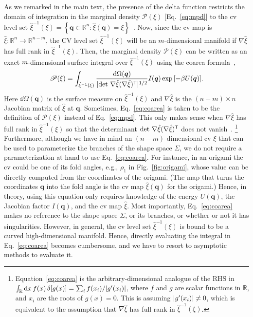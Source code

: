 As we remarked in the main text, the presence of the delta function restricts the domain of integration in the marginal density $\mathscr{P}(\xi)$ [Eq.~\eqref{eq:mpd}] to the \ac{cv} level set $\hat{\xi}^{-1}(\xi) = \left\{\bm{q} \in \mathbb{R}^{n}: \hat{\xi}(\bm{q}) = \xi\right\}$~\cite{hartmann2011}.
Now, since the \ac{cv} map is $\hat{\xi}: \mathbb{R}^{n} \to \mathbb{R}^{n-m}$, the CV level set $\hat{\xi}^{-1}(\xi)$ will be an $m$-dimensional manifold if $\nabla\hat{\xi}$ has full rank in $\hat{\xi}^{-1}(\xi)$.
Then, the marginal density $\mathscr{P}(\xi)$ can be written as an exact $m$-dimensional surface integral over $\hat{\xi}^{-1}(\xi)$ using the coarea formula~\cite{hartmann2007,lelievre2010,hartmann2011,diaconis2013},
%
\begin{equation}
  \mathscr{P}(\xi) = \int_{\hat{\xi}^{-1}(\xi)} \frac{\mathrm{d}\Omega(\bm{q})}{\lvert\det\,\nabla\hat{\xi}(\nabla\hat{\xi})^\mathsf{T}\rvert^{1/2}} I(\bm{q}) \exp{\left[-\beta U(\bm{q})\right]}.
  \label{eq:coarea}
\end{equation}
%
Here $\dd\Omega(\bm{q})$ is the surface measure on $\hat{\xi}^{-1}(\xi)$ and $\nabla\hat{\xi}$ is the $(n-m)\times n$ Jacobian matrix of $\hat{\xi}$ at $\bm{q}$.
Sometimes, Eq.~\eqref{eq:coarea} is taken to be the definition of $\mathscr{P}(\xi)$ instead of Eq.~\eqref{eq:mpd}.
This only makes sense when $\nabla\hat{\xi}$ has full rank in $\hat{\xi}^{-1}(\xi)$ so that the determinant $\det\,\nabla\hat{\xi}(\nabla\hat{\xi})^\mathsf{T}$ does not vanish~\cite{lelievre2010}.%
\footnote{Equation~\eqref{eq:coarea} is the arbitrary-dimensional analogue of the RHS in $\int_{\mathbb{R}} \mathrm{d}{x}\, f(x)\, \delta[g(x)] = \sum_{i} f(x_{i})/\lvert g'(x_{i})\rvert$, where $f$ and $g$ are scalar functions in $\mathbb{R}$, and $x_{i}$ are the roots of $g(x) = 0$. This is assuming $\lvert g'(x_{i})\rvert \neq 0$, which is equivalent to the assumption that $\nabla\hat{\xi}$ has full rank in $\hat{\xi}^{-1}(\xi)$.}
Furthermore, although we have in mind an $(n-m)$-dimensional \ac{cv} $\xi$ that can be used to parameterize the branches of the shape space $\Sigma$, we do not require a parameterization at hand to use Eq.~\eqref{eq:coarea}.
For instance, in an origami the \ac{cv} could be one of its fold angles, e.g., $\rho_{1}$ in Fig.~\ref{fig:origami}, whose value can be directly computed from the coordinates of the origami.
(The map that turns the coordinates $\bm{q}$ into the fold angle is the \ac{cv} map $\hat{\xi}(\bm{q})$ for the origami.)
Hence, in theory, using this equation only requires knowledge of the energy $U(\bm{q})$, the Jacobian factor $I(\bm{q})$, and the \ac{cv} map $\hat{\xi}$.
Most importantly, Eq.~\eqref{eq:coarea} makes no reference to the shape space $\Sigma$, or its branches, or whether or not it has singularities.
However, in general, the \ac{cv} level set $\hat{\xi}^{-1}(\xi)$ is bound to be a curved high-dimensional manifold.
Hence, directly evaluating the integral in Eq.~\eqref{eq:coarea} becomes cumbersome, and we have to resort to asymptotic methods to evaluate it.

